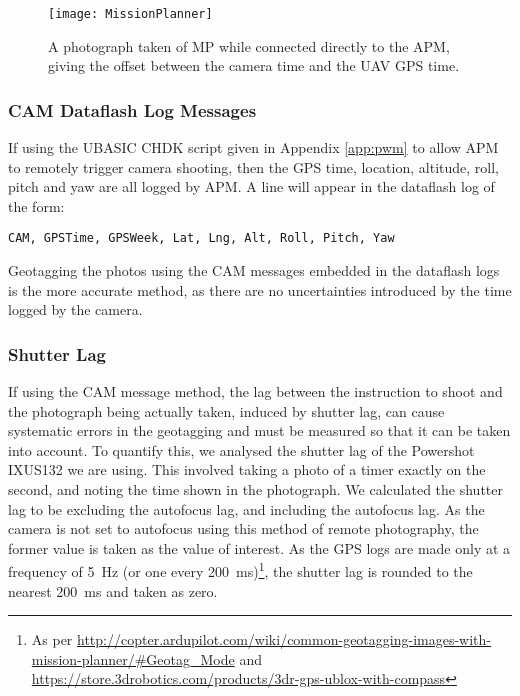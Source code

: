 \begin{wrapfigure}{r}{0.5\textwidth}
    \begin{center}
        \texttt{[image: MissionPlanner]}
        \caption{A photograph taken of MP while connected directly to the APM,
            giving the offset between the camera time and the UAV GPS time.}
        \label{img:mission-planner}
    \end{center}
\end{wrapfigure}

\subsubsection{CAM Dataflash Log Messages}

If using the UBASIC CHDK script given in Appendix \ref{app:pwm} to allow APM to
remotely trigger camera shooting, then the GPS time, location, altitude, roll,
pitch and yaw are all logged by APM. A line will appear in the dataflash log of
the form:

\begin{verbatim}
CAM, GPSTime, GPSWeek, Lat, Lng, Alt, Roll, Pitch, Yaw
\end{verbatim}

Geotagging the photos using the CAM messages embedded in the dataflash logs is
the more accurate method, as there are no uncertainties introduced by the time
logged by the camera. 

\subsubsection{Shutter Lag}

If using the CAM message method, the lag between the instruction to shoot and
the photograph being actually taken, induced by shutter lag, can cause
systematic errors in the geotagging and must be measured so that it can be taken
into account. To quantify this, we analysed the shutter lag of the Powershot
IXUS132 we are using. This involved taking a photo of a
timer exactly on the second, and
noting the time shown in the photograph. We calculated the shutter lag to be
 excluding the autofocus lag, and 
including the autofocus lag. As the camera is not set to autofocus using this
method of remote photography, the former value is taken as the value of
interest. As the GPS logs are made only at a frequency of \SI{5}{Hz} (or one
every \SI{200}{ms})\footnote{As per
\url{http://copter.ardupilot.com/wiki/common-geotagging-images-with-mission-planner/\#Geotag_Mode}
and \url{https://store.3drobotics.com/products/3dr-gps-ublox-with-compass}}, the
shutter lag is rounded to the nearest \SI{200}{ms} and taken as zero.

